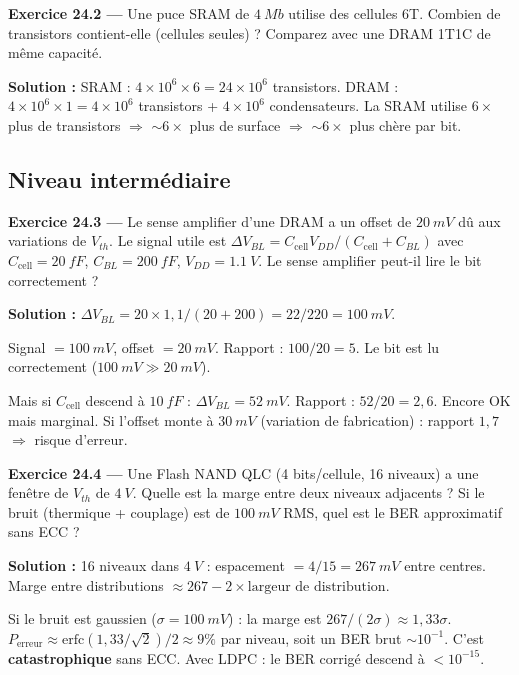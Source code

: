 \documentclass[12pt,a4paper,twoside]{book}
\begin{document}
\textbf{Exercice 24.2 ---} Une puce SRAM de $\SI{4}{Mb}$ utilise des cellules 6T. Combien de transistors contient-elle (cellules seules) ? Comparez avec une DRAM 1T1C de même capacité.

\begin{pratique}
\textbf{Solution :} SRAM : $4\times10^6 \times 6 = 24\times10^6$ transistors. DRAM : $4\times10^6 \times 1 = 4\times10^6$ transistors + $4\times10^6$ condensateurs. La SRAM utilise $6\times$ plus de transistors $\Rightarrow$ $\sim 6\times$ plus de surface $\Rightarrow$ $\sim 6\times$ plus chère par bit.
\end{pratique}

\subsection*{Niveau intermédiaire}

\textbf{Exercice 24.3 ---} Le sense amplifier d'une DRAM a un offset de $\SI{20}{mV}$ dû aux variations de $V_{th}$. Le signal utile est $\Delta V_{BL} = C_{\text{cell}} V_{DD}/(C_{\text{cell}}+C_{BL})$ avec $C_{\text{cell}} = \SI{20}{fF}$, $C_{BL} = \SI{200}{fF}$, $V_{DD} = \SI{1.1}{V}$. Le sense amplifier peut-il lire le bit correctement ?

\begin{pratique}
\textbf{Solution :} $\Delta V_{BL} = 20\times1{,}1/(20+200) = 22/220 = \SI{100}{mV}$.

Signal $= \SI{100}{mV}$, offset $= \SI{20}{mV}$. Rapport : $100/20 = 5$. Le bit est lu correctement ($\SI{100}{mV} \gg \SI{20}{mV}$).

Mais si $C_{\text{cell}}$ descend à $\SI{10}{fF}$ : $\Delta V_{BL} = \SI{52}{mV}$. Rapport : $52/20 = 2{,}6$. Encore OK mais marginal. Si l'offset monte à $\SI{30}{mV}$ (variation de fabrication) : rapport $1{,}7$ $\Rightarrow$ risque d'erreur.
\end{pratique}

\textbf{Exercice 24.4 ---} Une Flash NAND QLC (4 bits/cellule, 16 niveaux) a une fenêtre de $V_{th}$ de $\SI{4}{V}$. Quelle est la marge entre deux niveaux adjacents ? Si le bruit (thermique + couplage) est de $\SI{100}{mV}$ RMS, quel est le BER approximatif sans ECC ?

\begin{pratique}
\textbf{Solution :} 16 niveaux dans $\SI{4}{V}$ : espacement $= 4/15 = \SI{267}{mV}$ entre centres. Marge entre distributions $\approx 267 - 2\times\text{largeur de distribution}$.

Si le bruit est gaussien ($\sigma = \SI{100}{mV}$) : la marge est $267/(2\sigma) \approx 1{,}33\sigma$. $P_{\text{erreur}} \approx \text{erfc}(1{,}33/\sqrt{2})/2 \approx 9\%$ par niveau, soit un BER brut $\sim 10^{-1}$. C'est \textbf{catastrophique} sans ECC. Avec LDPC : le BER corrigé descend à $< 10^{-15}$.
\end{pratique}
\end{document}
